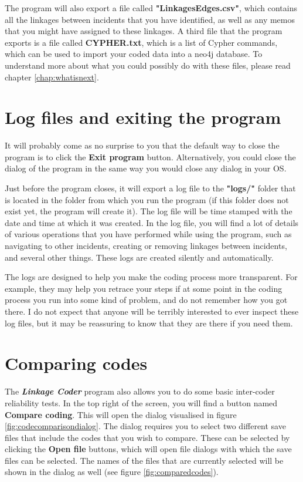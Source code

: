 \documentclass{memoir}
\begin{document}
The program will also export a file called \textbf{"Linkages\textunderscore Edges.csv"}, which contains all the linkages between incidents that you have identified, as well as any memos that you might have assigned to these linkages. A third file that the program exports is a file called \textbf{CYPHER.txt}, which is a list of Cypher commands, which can be used to import your coded data into a neo4j database. To understand more about what you could possibly do with these files, please read chapter \ref{chap:whatisnext}.

\section{Log files and exiting the program}
\label{sec:logfilesandexiting}

It will probably come as no surprise to you that the default way to close the program is to click the \textbf{Exit program} button. Alternatively, you could close the dialog of the program in the same way you would close any dialog in your OS.

Just before the program closes, it will export a log file to the \textbf{"logs/"} folder that is located in the folder from which you run the program (if this folder does not exist yet, the program will create it). The log file will be time stamped with the date and time at which it was created. In the log file, you will find a lot of details of various operations that you have performed while using the program, such as navigating to other incidents, creating or removing linkages between incidents, and several other things. These logs are created silently and automatically.

The logs are designed to help you make the coding process more transparent. For example, they may help you retrace your steps if at some point in the coding process you run into some kind of problem, and do not remember how you got there. I do not expect that anyone will be terribly interested to ever inspect these log files, but it may be reassuring to know that they are there if you need them.  

\section{Comparing codes}
\label{sec:comparingcodes}

The \emph{\textbf{Linkage Coder}} program also allows you to do some basic inter-coder reliability tests. In the top right of the screen, you will find a button named \textbf{Compare coding}. This will open the dialog visualised in figure \ref{fig:codecomparisondialog}. The dialog requires you to select two different save files that include the codes that you wish to compare. These can be selected by clicking the \textbf{Open file} buttons, which will open file dialogs with which the save files can be selected. The names of the files that are currently selected will be shown in the dialog as well (see figure \ref{fig:comparedcodes}). 
\end{document}
